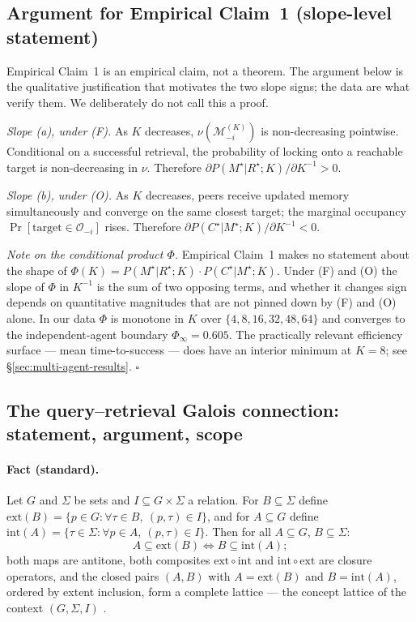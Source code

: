 \documentclass{article}
\begin{document}
\subsection{Argument for Empirical Claim~1 (slope-level statement)}

Empirical Claim~1 is an empirical claim, not a theorem. The argument below is the qualitative justification that motivates the two slope signs; the data are what verify them. We deliberately do not call this a proof.

\emph{Slope (a), under (F).} As $K$ decreases, $\nu(\mathcal{M}_{-i}^{(K)})$ is non-decreasing pointwise. Conditional on a successful retrieval, the probability of locking onto a reachable target is non-decreasing in $\nu$. Therefore $\partial P(M^\star|R^\star;K) / \partial K^{-1} > 0$.

\emph{Slope (b), under (O).} As $K$ decreases, peers receive updated memory simultaneously and converge on the same closest target; the marginal occupancy $\Pr[\text{target}\in\mathcal{O}_{-i}]$ rises. Therefore $\partial P(C^\star|M^\star;K) / \partial K^{-1} < 0$.

\emph{Note on the conditional product $\Phi$.} Empirical Claim~1 makes no statement about the shape of $\Phi(K) = P(M^\star|R^\star;K)\!\cdot\!P(C^\star|M^\star;K)$. Under (F) and (O) the slope of $\Phi$ in $K^{-1}$ is the sum of two opposing terms, and whether it changes sign depends on quantitative magnitudes that are not pinned down by (F) and (O) alone. In our data $\Phi$ is monotone in $K$ over $\{4,8,16,32,48,64\}$ and converges to the independent-agent boundary $\Phi_\infty = 0.605$. The practically relevant efficiency surface --- mean time-to-success --- does have an interior minimum at $K=8$; see \S\ref{sec:multi-agent-results}. \hfill$\square$

\subsection{The query--retrieval Galois connection: statement, argument, scope}
\label{app:galois}

\paragraph{Fact (standard).}
Let $G$ and $\Sigma$ be sets and $I \subseteq G \times \Sigma$ a relation. For $B \subseteq \Sigma$ define $\mathrm{ext}(B) = \{p \in G : \forall \tau \in B,\ (p,\tau) \in I\}$, and for $A \subseteq G$ define $\mathrm{int}(A) = \{\tau \in \Sigma : \forall p \in A,\ (p,\tau) \in I\}$. Then for all $A \subseteq G$, $B \subseteq \Sigma$:
\[
A \subseteq \mathrm{ext}(B) \iff B \subseteq \mathrm{int}(A);
\]
both maps are antitone, both composites $\mathrm{ext}\circ\mathrm{int}$ and $\mathrm{int}\circ\mathrm{ext}$ are closure operators, and the closed pairs $(A, B)$ with $A = \mathrm{ext}(B)$ and $B = \mathrm{int}(A)$, ordered by extent inclusion, form a complete lattice --- the concept lattice of the context $(G, \Sigma, I)$ \citep{ganter1999fca}.
\end{document}
